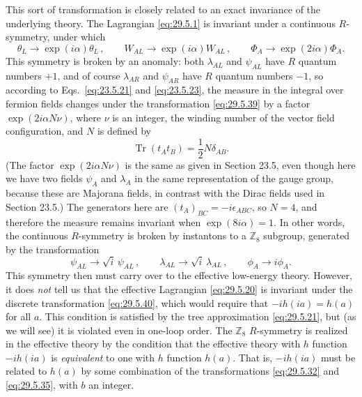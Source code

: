 This sort of transformation is closely related to an exact invariance of the
underlying theory. The Lagrangian \eqref{eq:29.5.1} is invariant under a
continuous \(R\)-symmetry, under which
\begin{equation}
  \theta_L\longrightarrow\exp(i\alpha)\theta_L\,,
  \qquad
  W_{AL}\longrightarrow\exp(i\alpha)W_{AL}\,,
  \qquad
  \Phi_A\longrightarrow\exp(2i\alpha)\Phi_A.
  \tag{29.5.39}\label{eq:29.5.39}
\end{equation}
This symmetry is broken by an anomaly: both \(\lambda_{AL}\) and
\(\psi_{AL}\) have \(R\) quantum numbers \(+1\), and of course
\(\lambda_{AR}\) and \(\psi_{AR}\) have \(R\) quantum numbers \(-1\), so
according to Eqs.~\eqref{eq:23.5.21} and \eqref{eq:23.5.23}, the measure in
the integral over fermion fields changes under the transformation
\eqref{eq:29.5.39} by a factor \(\exp(2i\alpha N\nu)\), where \(\nu\) is an
integer, the winding number of the vector field configuration, and \(N\) is
defined by
\[
  \operatorname{Tr}(t_At_B)=\frac12N\delta_{AB}.
\]
(The factor \(\exp(2i\alpha N\nu)\) is the same as given in Section 23.5,
even though here we have two fields \(\psi_A\) and \(\lambda_A\) in the same
representation of the gauge group, because these are Majorana fields, in
contrast with the Dirac fields used in Section 23.5.) The generators here
are \((t_A)_{BC}=-i\epsilon_{ABC}\), so \(N=4\), and therefore the measure
remains invariant when \(\exp(8i\alpha)=1\). In other words, the continuous
\(R\)-symmetry is broken by instantons to a \(\mathbb{Z}_8\) subgroup,
generated by the transformation
\begin{equation}
  \psi_{AL}\longrightarrow\sqrt{i}\,\psi_{AL}\,,
  \qquad
  \lambda_{AL}\longrightarrow\sqrt{i}\,\lambda_{AL}\,,
  \qquad
  \phi_A\longrightarrow i\phi_A.
  \tag{29.5.40}\label{eq:29.5.40}
\end{equation}
This symmetry then must carry over to the effective low-energy theory.
However, it does \textit{not} tell us that the effective Lagrangian
\eqref{eq:29.5.20} is invariant under the discrete transformation
\eqref{eq:29.5.40}, which would require that \(-ih(ia)=h(a)\) for all
\(a\). This condition is satisfied by the tree approximation
\eqref{eq:29.5.21}, but (as we will see) it is violated even in one-loop
order. The \(\mathbb{Z}_8\) \(R\)-symmetry is realized in the effective
theory by the condition that the effective theory with \(h\) function
\(-ih(ia)\) is \textit{equivalent} to one with \(h\) function \(h(a)\).
That is, \(-ih(ia)\) must be related to \(h(a)\) by some combination of the
transformations \eqref{eq:29.5.32} and \eqref{eq:29.5.35}, with \(b\) an
integer.

